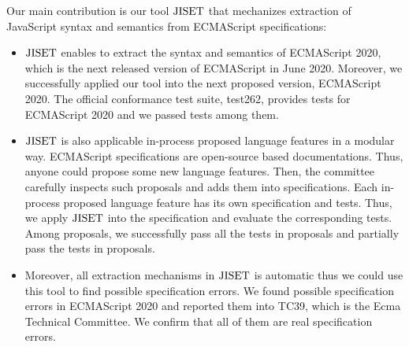 Our main contribution is our tool \( \text{JISET} \) that mechanizes extraction of JavaScript syntax and semantics
from ECMAScript specifications:
\begin{itemize}
  \item \( \text{JISET} \) enables to extract the syntax and semantics of ECMAScript 2020,
    which is the next released version of ECMAScript in June 2020.
    Moreover, we successfully applied our tool into the next proposed version,
    ECMAScript 2020. The official conformance test suite, test262, provides
     tests for ECMAScript 2020 and we passed  tests
    among them.
  \item \( \text{JISET} \) is also applicable in-process proposed language features in a modular way.
    ECMAScript specifications are open-source based documentations. Thus, anyone
    could propose some new language features. Then, the committee carefully inspects
    such proposals and adds them into specifications. Each in-process proposed language
    feature has its own specification and tests. Thus, we apply \( \text{JISET} \) into the specification
    and evaluate the corresponding tests. Among  proposals, we successfully
    pass all the tests in  proposals and partially pass the tests in 
    proposals.
  \item Moreover, all extraction mechanisms in \( \text{JISET} \) is automatic thus we could use this tool
    to find possible specification errors. We found  possible specification errors
    in ECMAScript 2020 and reported them into TC39, which is the Ecma Technical Committee.
    We confirm that all of them are real specification errors.
\end{itemize}
